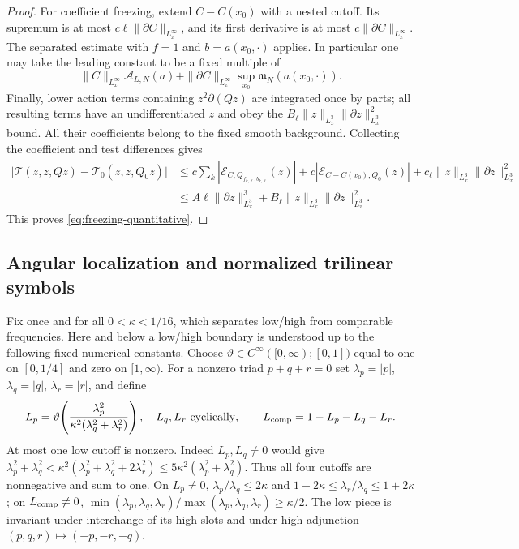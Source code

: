 \documentclass[11pt,a4paper]{article}
\numberwithin{equation}{section}
\newcommand{\f}[2]{\frac{#1}{#2}}
\theoremstyle{definition}
\begin{document}
\begin{proof}
For coefficient freezing, extend $C-C(x_0)$ with a nested cutoff.
Its supremum is at most $c\ell\|\partial C\|_{L^{\infty}_x}$, and its first derivative
is at most $c\|\partial C\|_{L^{\infty}_x}$. The separated estimate with $f=1$ and
$b=a(x_0,\cdot)$ applies. In particular one may take the leading
constant to be a fixed multiple of
\begin{equation*}
\|C\|_{L^{\infty}_x}\mathcal A_{L,N}(a)
+\|\partial C\|_{L^{\infty}_x}\sup_{x_0}\mathfrak m_N(a(x_0,\cdot)).
\end{equation*}
Finally, lower action terms containing $z^2\partial(Qz)$ are integrated once
by parts; all resulting terms have an undifferentiated $z$ and obey
the $B_\ell \|z\|_{L^3_x}\|\partial z\|_{L^3_x}^2$ bound. All their coefficients belong to the fixed
smooth background. Collecting the coefficient and test differences gives
\begin{equation*}
\begin{aligned}
\big|\mathcal T(z,z,Qz)-\mathcal T_0(z,z,Q_0z)\big|
&\leq c\sum_k|\mathcal E_{C,Q_{f_{k,\ell},b_{k,\ell}}}(z)|
       +c|\mathcal E_{C-C(x_0),Q_0}(z)|
       +c_\ell\|z\|_{L^3_x}\|\partial z\|_{L^3_x}^2\\
&\leq A\ell\|\partial z\|_{L^3_x}^3
       +B_\ell\|z\|_{L^3_x}\|\partial z\|_{L^3_x}^2.
\end{aligned}
\end{equation*}
This proves \eqref{eq:freezing-quantitative}.
\end{proof}

\subsection{Angular localization and normalized trilinear symbols}

Fix once and for all $0<\kappa<1/16$, which separates low/high from
comparable frequencies. Here and below a low/high boundary is understood
up to the following fixed numerical constants. Choose
$\vartheta\in C^\infty([0,\infty);[0,1])$ equal to one on $[0,1/4]$
and zero on $[1,\infty)$. For a nonzero triad $p+q+r=0$ set
$\lambda_p=|p|$, $\lambda_q=|q|$, $\lambda_r=|r|$, and define
\begin{equation}\label{eq:analytic-triad-partition}
L_p=\vartheta\!\left(\f{\lambda_p^2}{\kappa^2(\lambda_q^2+\lambda_r^2)}\right),
\quad L_q,L_r\ \hbox{cyclically},\qquad
L_{\rm comp}=1-L_p-L_q-L_r.
\end{equation}
At most one low cutoff is nonzero. Indeed $L_p,L_q\ne0$ would give
$\lambda_p^2+\lambda_q^2<\kappa^2(\lambda_p^2+\lambda_q^2+2\lambda_r^2)\leq5\kappa^2(\lambda_p^2+\lambda_q^2)$.
Thus all four cutoffs are nonnegative and sum to one. On $L_p\ne0$,
$\lambda_p/\lambda_q\leq2\kappa$ and $1-2\kappa\leq \lambda_r/\lambda_q\leq1+2\kappa$;
on $L_{\rm comp}\ne0$, $\min(\lambda_p,\lambda_q,\lambda_r)/\max(\lambda_p,\lambda_q,\lambda_r)\geq\kappa/2$.
The low piece is invariant under interchange of its high slots and
under high adjunction $(p,q,r)\mapsto(-p,-r,-q)$.
\end{document}
